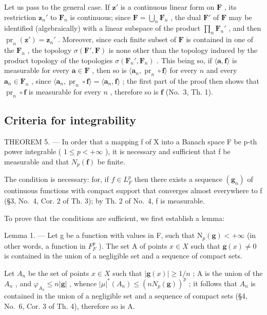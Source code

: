 Let us pass to the general case. If \(\mathbf{z}'\) is a continuous linear form on \(\mathbf{F}\) , its restriction \(\mathbf{z}_n'\) to \(\mathbf{F}_n\) is continuous; since \(\mathbf{F} = \bigcup_{n} \mathbf{F}_n\) , the dual \(\mathbf{F}'\) of \(\mathbf{F}\) may be identified (algebraically) with a linear subspace of the product \(\prod_{n} \mathbf{F}_n'\) , and then \(\operatorname{pr}_n(\mathbf{z}') = \mathbf{z}_n'\) . Moreover, since each finite subset of \(\mathbf{F}\) is contained in one of the \(\mathbf{F}_n\) , the topology \(\sigma(\mathbf{F}', \mathbf{F})\) is none other than the topology induced by the product topology of the topologies \(\sigma(\mathbf{F}_n', \mathbf{F}_n)\) . This being so, if \(\langle \mathbf{a}, \mathbf{f} \rangle\) is measurable for every \(\mathbf{a} \in \mathbf{F}\) , then so is \(\langle \mathbf{a}_n, \operatorname{pr}_n \circ \mathbf{f} \rangle\) for every \(n\) and every \(\mathbf{a}_n \in \mathbf{F}_n\) , since \(\langle \mathbf{a}_n, \operatorname{pr}_n \circ \mathbf{f} \rangle = \langle \mathbf{a}_n, \mathbf{f} \rangle\) ; the first part of the proof then shows that \(\operatorname{pr}_n \circ \mathbf{f}\) is measurable for every \(n\) , therefore so is \(\mathbf{f}\) (No.~3, Th. 1).

\subsection{Criteria for integrability}

THEOREM 5. --- In order that a mapping f of X into a Banach space F be p-th power integrable ( \(1 \leqslant p < +\infty\) ), it is necessary and sufficient that f be measurable and that \(N_{p}(\mathbf{f})\) be finite.

The condition is necessary: for, if \(f \in L_{F}^{p}\) then there exists a sequence \((\mathbf{g}_{n})\) of continuous functions with compact support that converges almost everywhere to f (§3, No.~4, Cor. 2 of Th. 3); by Th. 2 of No.~4, f is measurable.

To prove that the conditions are sufficient, we first establish a lemma:

Lemma 1. --- Let g be a function with values in F, such that \(\mathrm{N}_{p}(\mathbf{g}) < +\infty\) (in other words, a function in \(F_{F}^{p}\) ). The set A of points \(x \in X\) such that \(\mathbf{g}(x) \neq 0\) is contained in the union of a negligible set and a sequence of compact sets.

Let \(A_{n}\) be the set of points \(x \in X\) such that \(|\mathbf{g}(x)| \geqslant 1/n\) ; A is the union of the \(A_{n}\) , and \(\varphi_{A_{n}} \leqslant n|\mathbf{g}|\) , whence \(|\mu|^{*}(A_{n}) \leqslant (nN_{p}(\mathbf{g}))^{p}\) ; it follows that \(A_{n}\) is contained in the union of a negligible set and a sequence of compact sets (§4, No.~6, Cor. 3 of Th. 4), therefore so is A.

